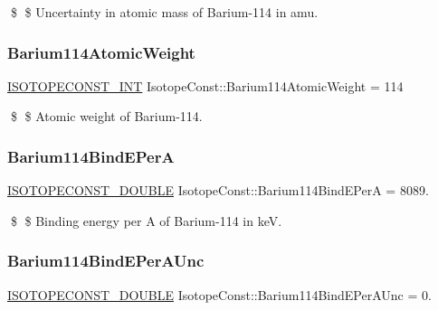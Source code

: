 \$ \$ Uncertainty in atomic mass of Barium-\/114 in amu. \mbox{\label{group___isotope_const-_barium-_ba114_ga9421463f160f3cc3bf5d8f90370a4f3c}} 
\subsubsection{\texorpdfstring{Barium114\+Atomic\+Weight}{Barium114AtomicWeight}}
{\footnotesize\ttfamily \mbox{\hyperlink{group___isotope_const-_macros_ga5f18360b3e99483a35c32d789e62621c}{I\+S\+O\+T\+O\+P\+E\+C\+O\+N\+S\+T\+\_\+\+I\+NT}} Isotope\+Const\+::\+Barium114\+Atomic\+Weight = 114}

\$ \$ Atomic weight of Barium-\/114. \mbox{\label{group___isotope_const-_barium-_ba114_ga8173cbeb4e5d17dceb558f2589cdb2ec}} 
\subsubsection{\texorpdfstring{Barium114\+Bind\+E\+PerA}{Barium114BindEPerA}}
{\footnotesize\ttfamily \mbox{\hyperlink{group___isotope_const-_macros_ga8f45a7272ce02c0b4c65c44636ed719a}{I\+S\+O\+T\+O\+P\+E\+C\+O\+N\+S\+T\+\_\+\+D\+O\+U\+B\+LE}} Isotope\+Const\+::\+Barium114\+Bind\+E\+PerA = 8089.}

\$ \$ Binding energy per A of Barium-\/114 in keV. \mbox{\label{group___isotope_const-_barium-_ba114_gaae1223b5f476292bfdd1314dafb8e00b}} 
\subsubsection{\texorpdfstring{Barium114\+Bind\+E\+Per\+A\+Unc}{Barium114BindEPerAUnc}}
{\footnotesize\ttfamily \mbox{\hyperlink{group___isotope_const-_macros_ga8f45a7272ce02c0b4c65c44636ed719a}{I\+S\+O\+T\+O\+P\+E\+C\+O\+N\+S\+T\+\_\+\+D\+O\+U\+B\+LE}} Isotope\+Const\+::\+Barium114\+Bind\+E\+Per\+A\+Unc = 0.}

